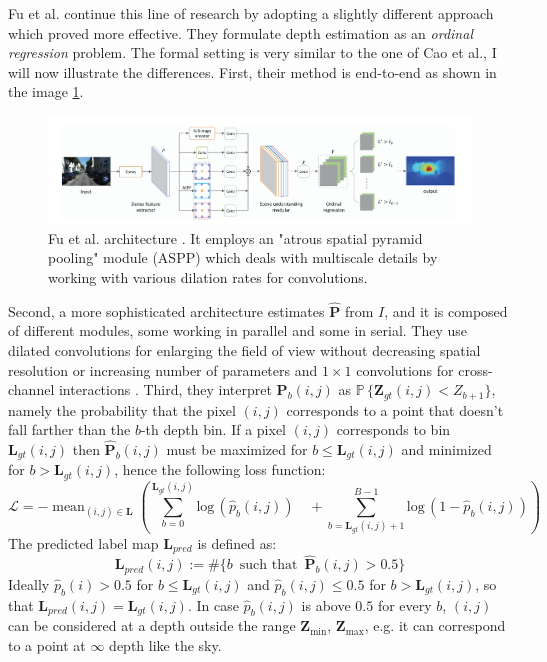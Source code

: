 Fu et al. \cite{ordinal_regression} continue this line of research by adopting a slightly different approach which proved more effective.
They formulate depth estimation as an \textit{ordinal regression} problem.
The formal setting is very similar to the one of Cao et al., I will now illustrate the differences.
First, their method is end-to-end as shown in the image \ref{fig:Fu_ordinal}.

\begin{figure}
	\centering
	\includegraphics[scale=0.5]{figs/Fu_ordinal}
	\caption{Fu et al. architecture \cite{ordinal_regression}. It employs an "atrous spatial pyramid pooling" module (ASPP) which deals with multiscale details by working with various dilation rates for convolutions. \label{fig:Fu_ordinal}}
\end{figure}

Second, a more sophisticated architecture estimates $\hat{\mathbf{P}}$ from $I$, and it is composed of different modules, some working in parallel and some in serial.
They use dilated convolutions for enlarging the field of view without decreasing spatial resolution or increasing number of parameters \cite{ordinal_regression} and $1 \times 1$ convolutions for cross-channel interactions \cite{ordinal_regression}.
Third, they interpret $\mathbf{P}_{b}(i,j)$ as $\mathbb{P} \, \{ \mathbf{Z}_{gt}(i,j) < Z_{b+1} \}$, namely the probability that the pixel $(i,j)$ corresponds to a point that doesn't fall farther than the $b$-th depth bin.
If a pixel $(i,j)$ corresponds to bin $\mathbf{L}_{gt}(i,j)$ then $\hat{\mathbf{P}}_{b}(i,j)$ must be maximized for $b \leq \mathbf{L}_{gt}(i,j)$ and minimized for $b > \mathbf{L}_{gt}(i,j)$, hence the following loss function:
\[
	\mathcal{L} = - \mathop{\text{mean}}_{(i,j) \in \mathbf{L}} \left(
		\sum_{b=0}^{\mathbf{L}_{gt}(i,j)} \text{log} \,( \hat{p}_{b}(i,j)) \quad +
		\sum_{b=\mathbf{L}_{gt}(i,j) + 1}^{B-1} \text{log} \, (1 - \hat{p}_{b}(i,j))
		\right)
\]
The predicted label map $\mathbf{L}_{pred}$ is defined as:
\[
	\mathbf{L}_{pred}(i,j) := \# \{b \, \text{ such that } \, \hat{\mathbf{P}}_{b}(i,j) > 0.5\}
\]
Ideally $\hat{p}_{b}(i) > 0.5$ for $b \leq \mathbf{L}_{gt}(i,j)$ and $\hat{p}_{b}(i,j) \leq 0.5$ for $b > \mathbf{L}_{gt}(i,j)$, so that $\mathbf{L}_{pred}(i,j) = \mathbf{L}_{gt}(i,j)$.
In case $\hat{p}_{b}(i,j)$ is above $0.5$ for every $b$, $(i,j)$ can be considered at a depth outside the range $\mathbf{Z}_{\text{min}}$, $\mathbf{Z}_{\text{max}}$, e.g. it can correspond to a point at $\infty$ depth like the sky.

